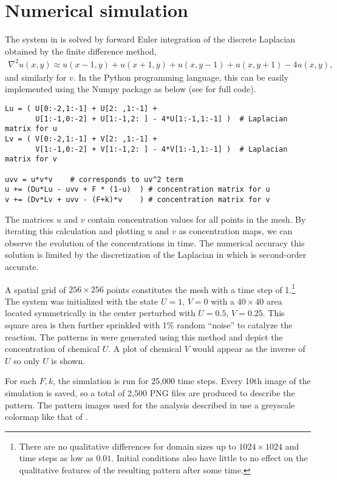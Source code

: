 \section{Numerical simulation} \label{ch1:gs-simulation}

The system in  is solved by forward Euler integration of the discrete Laplacian obtained by the finite difference method,
	\begin{align}\label{eq:laplacian}
		\nabla^2 u(x,y) \approx u(x-1, y) + u(x+1, y) + u(x, y-1) + u(x, y+1) - 4 u(x, y),
	\end{align}
and similarly for $v$. In the Python programming language, this can be easily implemented using the Numpy package as below (see  for full code).
%
\begin{Verbatim}[fontsize=\footnotesize,frame=leftline,framesep=5mm]
Lu = ( U[0:-2,1:-1] + U[2: ,1:-1] + 
       U[1:-1,0:-2] + U[1:-1,2: ] - 4*U[1:-1,1:-1] )  # Laplacian matrix for u
Lv = ( V[0:-2,1:-1] + V[2: ,1:-1] + 
       V[1:-1,0:-2] + V[1:-1,2: ] - 4*V[1:-1,1:-1] )  # Laplacian matrix for v

uvv = u*v*v    # corresponds to uv^2 term
u += (Du*Lu - uvv + F * (1-u)  ) # concentration matrix for u
v += (Dv*Lv + uvv - (F+k)*v    ) # concentration matrix for v
\end{Verbatim}
%
The matrices $u$ and $v$ contain concentration values for all points in the mesh. By iterating this calculation and plotting $u$ and $v$ as concentration maps, we can observe the evolution of the concentrations in time. The numerical accuracy this solution is limited by the discretization of the Laplacian in  which is second-order accurate.

A spatial grid of $256 \times 256$ points constitutes the mesh with a time step of 1.\footnote{There are no qualitative differences for domain sizes up to $1024 \times 1024$ and time steps as low as $0.01$. Initial conditions also have little to no effect on the qualitative features of the resulting pattern after some time.} The system was initialized with the state $U=1$, $V=0$ with a $40 \times 40$ area located symmetrically in the center perturbed with $U=0.5$, $V=0.25$. This square area is then further sprinkled with 1\% random ``noise'' to catalyze the reaction. The patterns in  were generated using this method and depict the concentration of chemical $U$. A plot of chemical $V$ would appear as the inverse of $U$ so only $U$ is shown.

For each $F, k$, the simulation is run for 25,000 time steps. Every 10th image of the simulation is saved, so a total of 2,500 PNG files are produced to describe the pattern. The pattern images used for the analysis described in  use a greyscale colormap like that of .



